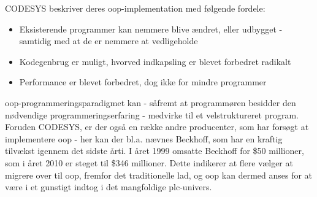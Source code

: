 
\noindent CODESYS beskriver deres \gls{oop}-implementation med følgende fordele\cite{codesys-oop-benefits}:
\begin{itemize}
\item Eksisterende programmer kan nemmere blive ændret, eller udbygget - samtidig med at de er nemmere at vedligeholde
\item Kodegenbrug er muligt, hvorved indkapsling er blevet forbedret radikalt
\item Performance er blevet forbedret, dog ikke for mindre programmer
\end{itemize}

\noindent\gls{oop}-programmeringsparadigmet kan - såfremt at programmøren besidder den nødvendige programmeringserfaring - medvirke til et velstruktureret program. Foruden CODESYS, er der også en række andre producenter, som har forsøgt at implementere \gls{oop} - her kan der bl.a. nævnes Beckhoff, som har en kraftig tilvækst igennem det sidste årti. I året 1999 omsatte Beckhoff for \$50 millioner, som i året 2010 er steget til \$346 millioner. Dette indikerer at flere vælger at migrere over til \gls{oop}, fremfor det traditionelle \gls{lad}, og \gls{oop} kan dermed anses for at være i et gunstigt indtog i det mangfoldige \gls{plc}-univers\cite{beckhoff-sold}.







